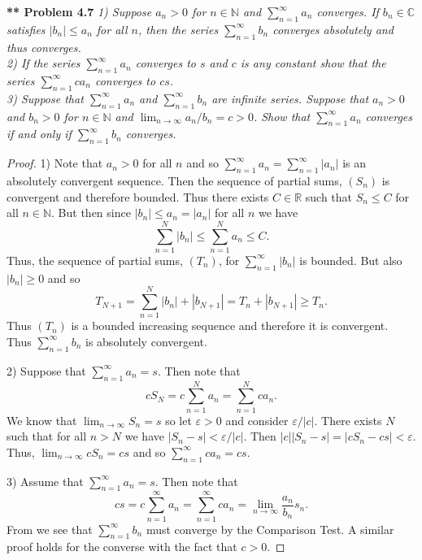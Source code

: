 \documentclass{article}
\begin{document}
\begin{flushleft}
\textbf{** Problem 4.7}
\textit{1) Suppose $a_n > 0$ for $n \in \mathbb{N}$ and $\sum_{n=1}^{\infty} a_n$ converges. If $b_n \in \mathbb{C}$ satisfies $|b_n| \leq a_n$ for all $n$, then the series $\sum_{n=1}^{\infty} b_n$ converges absolutely and thus converges.\\
2) If the series $\sum_{n=1}^{\infty} a_n$ converges to $s$ and $c$ is any constant show that the series $\sum_{n=1}^{\infty} ca_n$ converges to $cs$.\\
3) Suppose that $\sum_{n=1}^{\infty} a_n$ and $\sum_{n=1}^{\infty} b_n$ are infinite series. Suppose that $a_n > 0$ and $b_n > 0$ for $n \in \mathbb{N}$ and $\lim_{n \rightarrow \infty} a_n/b_n = c > 0$. Show that $\sum_{n=1}^{\infty} a_n$ converges if and only if $\sum_{n=1}^{\infty} b_n$ converges.}
\begin{proof}
1) Note that $a_n > 0$ for all $n$ and so $\sum_{n=1}^{\infty} a_n = \sum_{n=1}^{\infty} |a_n|$ is an absolutely convergent sequence. Then the sequence of partial sums, $(S_n)$ is convergent and therefore bounded. Thus there exists $C \in \mathbb{R}$ such that $S_n \leq C$ for all $n \in \mathbb{N}$. But then since $|b_n| \leq a_n = |a_n|$ for all $n$ we have
\[
\sum_{n=1}^{N} |b_n| \leq \sum_{n=1}^{N} a_n \leq C.
\]
Thus, the sequence of partial sums, $(T_n)$, for $\sum_{n=1}^{\infty} |b_n|$ is bounded. But also $|b_n| \geq 0$ and so
\[
T_{N+1} = \sum_{n=1}^{N} |b_n| + |b_{N+1}| = T_n + |b_{N+1}| \geq T_n.
\]
Thus $(T_n)$ is a bounded increasing sequence and therefore it is convergent. Thus $\sum_{n=1}^{\infty} b_n$ is absolutely convergent.\newline

2) Suppose that $\sum_{n=1}^{\infty} a_n = s$. Then note that
\[
cS_N = c \sum_{n=1}^{N} a_n = \sum_{n=1}^{N} ca_n.
\]
We know that $\lim_{n \rightarrow \infty} S_n = s$ so let $\varepsilon > 0$ and consider $\varepsilon/|c|$. There exists $N$ such that for all $n > N$ we have $|S_n - s| < \varepsilon/|c|$. Then $|c||S_n - s| = |cS_n - cs| < \varepsilon$. Thus, $\lim_{n \rightarrow \infty} cS_n = cs$ and so $\sum_{n=1}^{\infty} ca_n = cs$.\newline

3) Assume that $\sum_{n=1}^{\infty} a_n = s$. Then note that
\[
cs = c \sum_{n=1}^{\infty} a_n = \sum_{n=1}^{\infty} ca_n = \lim_{n \rightarrow \infty} \frac{a_n}{b_n} s_n.
\]
From we see that $\sum_{n=1}^{\infty} b_n$ must converge by the Comparison Test. A similar proof holds for the converse with the fact that $c > 0$.
\end{proof}


\end{flushleft}
\end{document}
